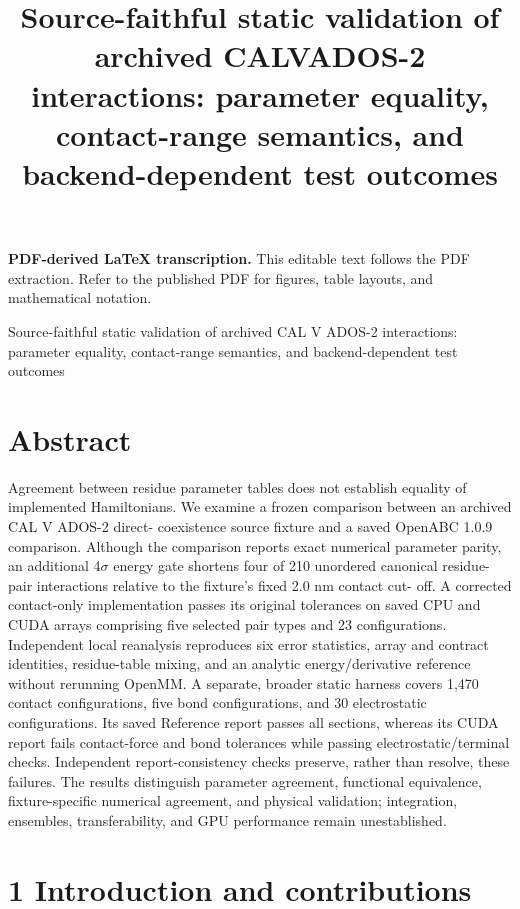 \documentclass[11pt]{article}
\title{Source-faithful static validation of archived CALVADOS-2 interactions: parameter equality, contact-range semantics, and backend-dependent test outcomes}
\author{}
\date{}
\begin{document}
\maketitle
\noindent\textbf{PDF-derived LaTeX transcription.} This editable text follows the PDF extraction. Refer to the published PDF for figures, table layouts, and mathematical notation.


Source-faithful static validation of archived CAL V ADOS-2
interactions: parameter equality, contact-range semantics, and
backend-dependent test outcomes

\section*{Abstract}

Agreement between residue parameter tables does not establish equality of implemented
Hamiltonians. We examine a frozen comparison between an archived CAL V ADOS-2 direct-
coexistence source fixture and a saved OpenABC 1.0.9 comparison. Although the comparison
reports exact numerical parameter parity, an additional 4\ensuremath{\sigma} energy gate shortens four of 210
unordered canonical residue-pair interactions relative to the fixture’s fixed 2.0 nm contact cut-
off. A corrected contact-only implementation passes its original tolerances on saved CPU and
CUDA arrays comprising five selected pair types and 23 configurations. Independent local
reanalysis reproduces six error statistics, array and contract identities, residue-table mixing,
and an analytic energy/derivative reference without rerunning OpenMM. A separate, broader
static harness covers 1,470 contact configurations, five bond configurations, and 30 electrostatic
configurations. Its saved Reference report passes all sections, whereas its CUDA report fails
contact-force and bond tolerances while passing electrostatic/terminal checks. Independent
report-consistency checks preserve, rather than resolve, these failures. The results distinguish
parameter agreement, functional equivalence, fixture-specific numerical agreement, and physical
validation; integration, ensembles, transferability, and GPU performance remain unestablished.

\section*{1 Introduction and contributions}
\end{document}
